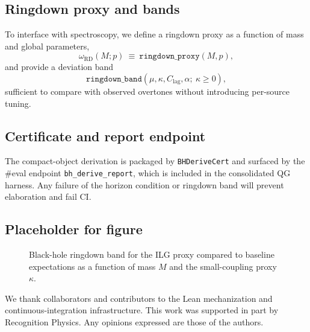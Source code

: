 \documentclass[aps,prd,twocolumn,superscriptaddress,nofootinbib,floatfix,longbibliography]{revtex4-2}
\newcommand{\lean}[1]{\texttt{#1}}
\begin{document}
\subsection{Ringdown proxy and bands}
To interface with spectroscopy, we define a ringdown proxy as a function of mass and global parameters,
\begin{equation}
  \omega_{\mathrm{RD}}(M;p)\ \equiv\ \texttt{ringdown\_proxy}(M,p),
\end{equation}
and provide a deviation band
\begin{equation}
  \texttt{ringdown\_band}(\mu,\kappa,C_{\mathrm{lag}},\alpha;\ \kappa\ge 0),
\end{equation}
sufficient to compare with observed overtones without introducing per-source tuning.

\subsection{Certificate and report endpoint}
The compact-object derivation is packaged by \lean{BHDeriveCert} and surfaced by the \#eval endpoint \lean{bh_derive_report}, which is included in the consolidated QG harness. Any failure of the horizon condition or ringdown band will prevent elaboration and fail CI.

\subsection{Placeholder for figure}
\begin{figure}[t]
  \centering
  \caption{Black-hole ringdown band for the ILG proxy compared to baseline expectations as a function of mass $M$ and the small-coupling proxy $\kappa$.}
  \label{fig:bh-rd}
\end{figure}

% 
% 
% 
% 
% 
% 
% 
% 
% 
% 
% 
% 

\begin{acknowledgments}
We thank collaborators and contributors to the Lean mechanization and continuous-integration infrastructure. This work was supported in part by Recognition Physics. Any opinions expressed are those of the authors.
\end{acknowledgments}
\end{document}
